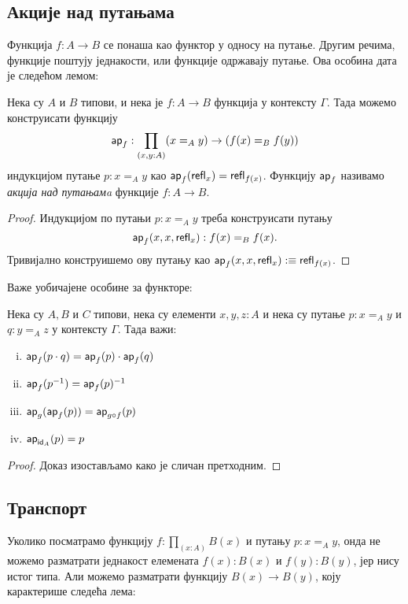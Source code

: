 \documentclass[12pt,oneside]{memoir}
\begin{document}
\subsection{Акције над путањама}

Функција $f : A \to B$ се понаша као функтор у односу на путање. Другим речима, функције поштују једнакости, или функције одржавају путање. Ова особина дата је следећом лемом:

\begin{lemma}
    \label{lmm:ap}
    Нека су $A$ и $B$ типови, и нека је $f : A \to B$ функција у контексту $\Gamma$. Тада можемо конструисати функцију 
    \[\mathsf{ap}_{f} : \prod_{(x,y:A)} (x =_{A} y) \to (f (x) =_{B} f (y))\]
    индукцијом путање $p : x =_{A} y$ као $\mathsf{ap}_{f} (\mathsf{refl}_{x}) = \mathsf{refl}_{f(x)}$. Функцију $\mathsf{ap}_{f}$ називамо \emph{акција над путањамa} функције $f : A \to B$.
\end{lemma}
\begin{proof}
    Индукцијом по путањи $p : x =_{A} y$ треба конструисати путању
    \[\mathsf{ap}_{f} (x, x, \mathsf{refl}_{x}) : f(x) =_B f(x).\]
    Тривијално конструишемо ову путању као $\mathsf{ap}_{f} (x, x, \mathsf{refl}_{x}) :\equiv \mathsf{refl}_{f(x)}$.
\end{proof}

Важе уобичајене особине за функторе:

\begin{lemma}
    \label{lmm:app}
    Нека су $A, B$ и $C$ типови, нека су елементи $x, y, z : A$ и нека су путање $p : x =_A y$ и $q : y =_A z$ у контексту $\Gamma$. Тада важи:
    \begin{enumerate}[(i)]
        \item $\mathsf{ap}_{f} (p \cdot q) = \mathsf{ap}_{f}(p) \cdot \mathsf{ap}_{f}(q)$
        \item $\mathsf{ap}_{f} (p^{-1}) = \mathsf{ap}_{f}(p)^{-1}$
        \item $\mathsf{ap}_{g} (\mathsf{ap}_{f} (p)) = \mathsf{ap}_{g \circ f} (p)$
        \item $\mathsf{ap}_{\mathsf{id}_{A}} (p) = p$
    \end{enumerate}
\end{lemma}
\begin{proof}
    Доказ изостављамо како је сличан претходним.
\end{proof}

\subsection{Транспорт}

Уколико посматрамо функцију $f : \prod_{(x : A)} B(x)$ и путању $p : x =_A y$, онда не можемо разматрати једнакост елемената $f(x) : B(x)$ и $f(y) : B(y)$, јер нису истог типа. Али можемо разматрати функцију $B(x) \to B(y)$, коју карактерише следећа лема:
\end{document}
